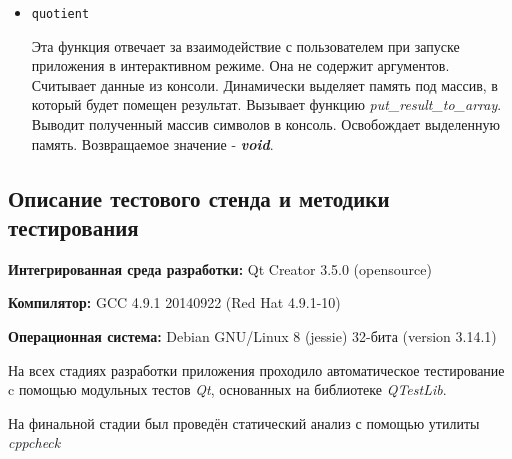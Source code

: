 \documentclass[12pt,a4paper]{report}
\begin{document}
\begin{enumerate}
\begin{itemize}
\item \verb-quotient-

Эта функция отвечает за взаимодействие с пользователем при запуске приложения в интерактивном режиме. Она не содержит аргументов. Считывает данные из консоли. Динамически выделяет память под массив, в который будет помещен результат. Вызывает функцию \textit{put\_result\_to\_array}. Выводит полученный массив символов в консоль. Освобождает выделенную память. Возвращаемое значение - \textit{\textbf{void}}.
\end{itemize}
\end{enumerate}
\subsection{Описание тестового стенда и методики тестирования}

\begin{flushleft}
\textbf{Интегрированная среда разработки:} Qt Creator 3.5.0 (opensource)

\textbf{Компилятор:} GCC 4.9.1 20140922 (Red Hat 4.9.1-10)

\textbf{Операционная система:} Debian GNU/Linux 8 (jessie) 32-бита (version 3.14.1)
\end{flushleft}

На всех стадиях разработки приложения проходило автоматическое тестирование c помощью модульных тестов \textit{Qt}, основанных на библиотеке  \textit{QTestLib}.

На финальной стадии был проведён статический анализ с помощью утилиты \textit{cppcheck}%
\end{document}
